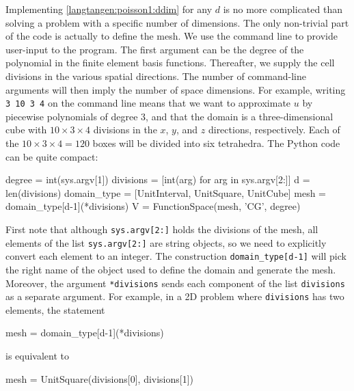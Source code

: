 Implementing \eqref{langtangen:poisson1:ddim} for any $d$ is no more
complicated than solving a problem with a specific number of dimensions.
The only non-trivial part of the code is actually to define the mesh.
We use the command line to provide user-input to the program. The first argument
can be the degree of the polynomial in the finite element basis functions.
Thereafter, we supply the
cell divisions in the various spatial directions. The number of
command-line arguments will then imply the number of space dimensions.
For example, writing {\fontsize{10pt}{10pt}\texttt{3 10 3 4}} on the command line means that
we want to approximate $u$ by piecewise polynomials of degree 3,
and that the domain is a three-dimensional cube with $10\times 3\times 4$
divisions in the $x$, $y$, and $z$ directions, respectively.
Each of the $10\times 3\times 4 = 120$ boxes will
be divided into six tetrahedra.
The Python code can be quite compact:
\begin{python}
degree = int(sys.argv[1])
divisions = [int(arg) for arg in sys.argv[2:]]
d = len(divisions)
domain_type = [UnitInterval, UnitSquare, UnitCube]
mesh = domain_type[d-1](*divisions)
V = FunctionSpace(mesh, 'CG', degree)
\end{python}
First note that although {\fontsize{10pt}{10pt}\texttt{sys.argv[2:]}} holds the divisions of
the mesh, all elements of the list {\fontsize{10pt}{10pt}\texttt{sys.argv[2:]}} are string objects,
so we need to explicitly convert each element to an integer.
The construction {\fontsize{10pt}{10pt}\verb!domain_type[d-1]!} will pick the right name of the
object used to define the domain and generate the mesh. 
Moreover, the argument {\fontsize{10pt}{10pt}\texttt{*divisions}}
sends each component of the list {\fontsize{10pt}{10pt}\texttt{divisions}} as a separate
argument. For example, in a 2D problem where {\fontsize{10pt}{10pt}\texttt{divisions}} has
two elements, the statement
\begin{python}
mesh = domain_type[d-1](*divisions)
\end{python}
is equivalent to
\begin{python}
mesh = UnitSquare(divisions[0], divisions[1])
\end{python}

